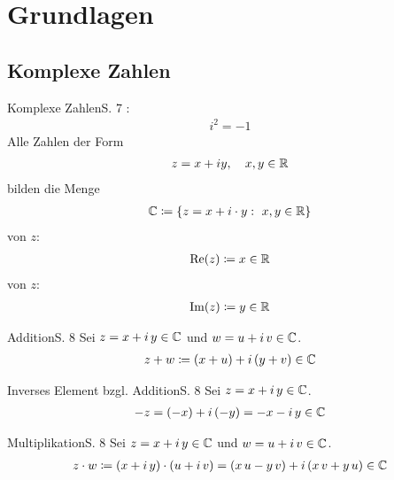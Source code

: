 \section{Grundlagen}



\subsection{Komplexe Zahlen}

\begin{bemerkung}{Komplexe Zahlen}{S. 7}
  :
  \begin{align}
    i^2 = -1
  \end{align}
  Alle Zahlen der Form
  \begin{align}
    z = x + iy, \quad x,y \in \mathbb{R}
  \end{align}
  bilden die Menge
  \begin{align}
    \label{eq:1_2}
    \mathbb{C} \coloneqq \{ z = x + i \cdot y :\ x,y \in \mathbb{R} \}
  \end{align}
   von $z$:
  \begin{align}
    \operatorname{Re}(z) \coloneqq x \in \mathbb{R}
  \end{align}
   von $z$:
  \begin{align}
    \operatorname{Im}(z) \coloneqq y \in \mathbb{R}
  \end{align}
\end{bemerkung}

\begin{bemerkung}{Addition}{S. 8}
  Sei $z = x + i \, y \in \mathbb{C}$ und $w = u + i \, v \in \mathbb{C}$.
  \begin{align}
    \label{eq:addition}
    z + w \coloneqq (x + u) + i \, (y + v) \in \mathbb{C}
  \end{align}
\end{bemerkung}

\begin{bemerkung}{Inverses Element bzgl. Addition}{S. 8}
  Sei $z = x + i \, y \in \mathbb{C}$.
  \begin{align}
    \label{eq:inv_addition}
    -z = (-x) + i \, (-y) = - x - i \, y \in \mathbb{C}
  \end{align}
\end{bemerkung}

\begin{bemerkung}{Multiplikation}{S. 8}
  Sei $z = x + i \, y \in \mathbb{C}$ und $w = u + i \, v \in \mathbb{C}$.
  \begin{align}
    \label{eq:multiplikation}
    z \cdot w
      \coloneqq (x + i \, y) \cdot (u + i \, v)
      = (x \, u - y \, v) + i \, (x \, v + y \, u)
      \in \mathbb{C}
  \end{align}
\end{bemerkung}

